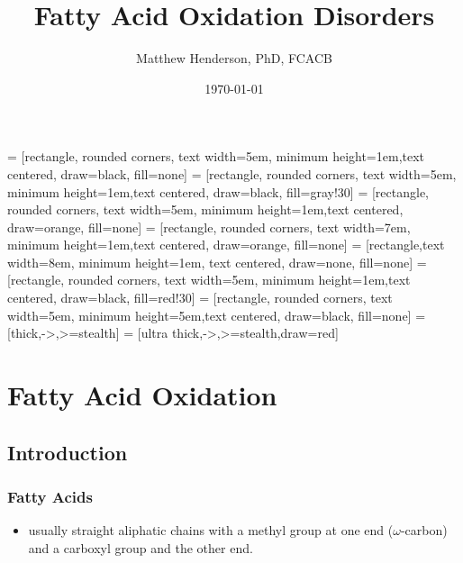 \documentclass{scrartcl}
\author{Matthew Henderson, PhD, FCACB}
\date{\today}
\title{Fatty Acid Oxidation Disorders}
\begin{document}
\maketitle
\setcounter{tocdepth}{2}
\tableofcontents


 = [rectangle, rounded corners, text width=5em, minimum height=1em,text centered, draw=black, fill=none]
 = [rectangle, rounded corners, text width=5em, minimum height=1em,text centered, draw=black, fill=gray!30]
 = [rectangle, rounded corners, text width=5em, minimum height=1em,text centered, draw=orange, fill=none]
 = [rectangle, rounded corners, text width=7em, minimum height=1em,text centered, draw=orange, fill=none]
 = [rectangle,text width=8em, minimum height=1em, text centered, draw=none, fill=none]
 = [rectangle, rounded corners, text width=5em, minimum height=1em,text centered, draw=black, fill=red!30]
 = [rectangle, rounded corners, text width=5em, minimum height=5em,text centered, draw=black, fill=none]
 = [thick,->,>=stealth]
 = [ultra thick,->,>=stealth,draw=red]


\section{Fatty Acid Oxidation}
\label{sec:org2427400}
\subsection{Introduction}
\label{sec:org580f92f}
\subsubsection{Fatty Acids}
\label{sec:org58009c3}
\begin{itemize}
\item usually straight aliphatic chains with a methyl group at one end
(\(\omega\)-carbon) and a carboxyl group and the other end.
\end{itemize}

\end{document}
